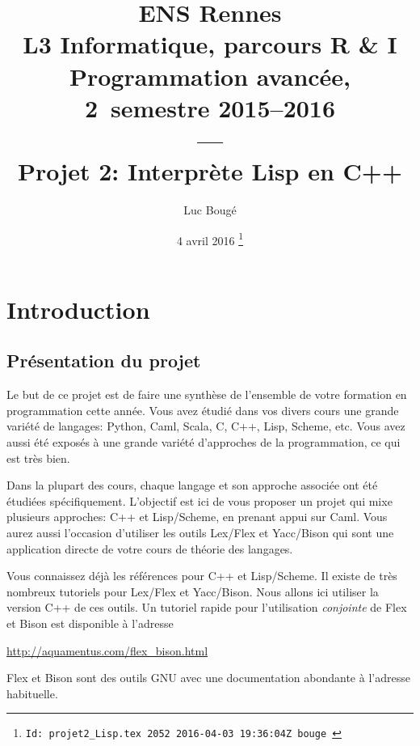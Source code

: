 \documentclass{../../../LaTeX/tdsimple}
\begin{document}
\title{ENS Rennes\\
  L3 Informatique, parcours R \& I\\
  Programmation avancée, 2\ieme\ semestre 2015--2016\\
  ---\\
  Projet 2: Interprète Lisp en C++%
}

\author{%
  Luc Bougé%
}

\date{4 avril 2016%
  \thanks{%
    \protect\lstinline[language={}]%
    $Id: projet2_Lisp.tex 2052 2016-04-03 19:36:04Z bouge $%
  } }


\maketitle

\section*{Introduction}

\subsection*{Présentation du projet}

Le but de ce projet est de faire une synthèse de l'ensemble de votre
formation en programmation cette année. Vous avez étudié dans vos
divers cours une grande variété de langages: Python, Caml, Scala, C,
C++, Lisp, Scheme, etc. Vous avez aussi été exposés à une grande
variété d'approches de la programmation, ce qui est très bien.

Dans la plupart des cours, chaque langage et son approche associée
ont été étudiées spécifiquement. L'objectif est ici de vous proposer
un projet qui mixe plusieurs approches: C++ et Lisp/Scheme, en prenant
appui sur Caml. Vous aurez aussi l'occasion d'utiliser les outils Lex/Flex et
Yacc/Bison qui sont une application directe de votre cours de théorie des
langages. 

Vous connaissez déjà les références pour C++ et Lisp/Scheme. Il existe
de très nombreux tutoriels pour Lex/Flex et Yacc/Bison. Nous allons
ici utiliser la version C++ de ces outils. Un tutoriel rapide pour
l'utilisation \emph{conjointe} de Flex et Bison est disponible à
l'adresse
\begin{center}
  \url{http://aquamentus.com/flex_bison.html}
\end{center}
Flex et Bison sont des outils GNU avec une documentation abondante à
l'adresse habituelle.
\end{document}
